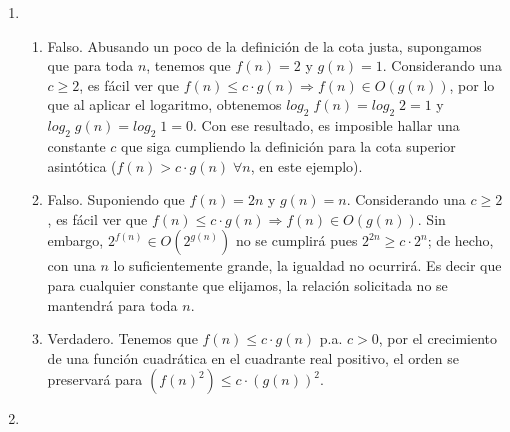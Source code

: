 \documentclass[12pt]{article}
\newenvironment{boenumerate}
               {\begin{enumerate}\renewcommand\labelenumi{\textbf{\theenumi.}}}
               {\end{enumerate}}
\begin{document}
\begin{boenumerate}
\begin{itemize}
      Sacamos el logaritmo de ambas funciones y nos queda $log\ f_1 = log(log\ n))$ y $log\ f_2 = log(n^{1/9}) = \frac{1}{9}log\ n$. \\
      Sustituimos $z = log\ n$, con lo cual tenemos $log\ f_1 = log\ z$ y $log\ f_2 = \frac{1}{9}z$. Tenemos que para $z > 1$, $log\ z > \frac{1}{9}z$, y por lo tanto $g_4(n) = O(g_3(n))$.
    \item Comparamos $g_1(n) = 2^{\sqrt{log\ n}}$ con $g_4(n) = n^{4/3}$: \\
      Tenemos que $log(g_1(n)) = log(2^{\sqrt{log\ n}}) = \sqrt{log\ n}$ y $log(g_4(n)) = log(n^{4/3}) = \frac{4}{3}log\ n = log\ n + \frac{1}{3} log\ n$. Sabemos que $log\ n > \sqrt{log\ n}$, entonces $log\ n + \frac{1}{3} log\ n > \sqrt{log\ n}$ y por lo tanto $g_1 = O(g_4)$. \\
        Concluimos que nuestro orden creciente de funciones queda de la siguiente manera: \\
        $g_6,g_7,g_2,g_5,g_3,g_4,g_1$.
        
  \end{itemize}  
\item
  \begin{enumerate}
  \item Falso. Abusando un poco de la definición de la cota justa, supongamos que para toda $n$, tenemos que $f(n) = 2$ y 
    $g(n) = 1$. Considerando una $c \geq 2$, es fácil ver que $f(n) \leq c \cdot g(n) \Rightarrow f(n) \in O(g(n))$, por lo que al aplicar el logaritmo, obtenemos $log_2\;f(n) = log_2\; 2 = 1$ y $log_2\;g(n) = log_2\; 1 = 0$. Con ese resultado, es imposible hallar una constante $c$ que siga cumpliendo la definición para la cota superior asintótica ($f(n) > c\cdot g(n) \;\forall n$, en este ejemplo).
  \item Falso. Suponiendo que $f(n) = 2n$ y $g(n) = n$. Considerando una $c \geq 2$, es fácil ver que $f(n) \leq c \cdot g(n) \Rightarrow f(n) \in O(g(n))$. Sin embargo, $2^{f(n)} \in O(2^{g(n)})$ no se cumplirá
    pues $2^{2n} \geq c \cdot 2^n$; de hecho, con una $n$ lo suficientemente grande, la igualdad no ocurrirá. Es decir que para cualquier constante que elijamos, la relación solicitada no se mantendrá para toda $n$.
  \item Verdadero. Tenemos que $f(n) \leq c \cdot g(n)$ p.a. $c > 0$, por el crecimiento
    de una función cuadrática en el cuadrante real positivo, el orden se preservará para
    $(f(n)^2) \leq c \cdot (g(n))^2$.
  \end{enumerate}
\item
\end{boenumerate}
\end{document}
